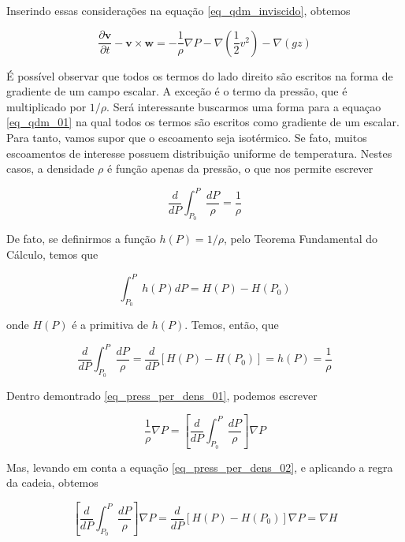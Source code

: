 \documentclass[a4paper,portuguese,10pt]{article}
\newcommand{\grad}{\nabla}
\renewcommand{\D}{\partial}
\renewcommand{\vec}{\mathbf}
\begin{document}
Inserindo essas considerações na equação \ref{eq_qdm_inviscido}, obtemos

\begin{equation}
  \frac{\D\vec{v}}{\D t} -\vec{v}\times\vec{w} = -\frac{1}{\rho}\grad P - \grad\left(\frac{1}{2}v^2\right) -\grad(gz)
\label{eq_qdm_01}
\end{equation}

É possível observar que todos os termos do lado direito são escritos na forma de gradiente de um campo escalar. A exceção é o termo da pressão, que é multiplicado por $1/\rho$. Será interessante buscarmos uma forma para a equaçao \ref{eq_qdm_01} na qual todos os termos são escritos como gradiente de um escalar. Para tanto, vamos supor que o escoamento seja isotérmico. Se fato, muitos escoamentos de interesse possuem distribuição uniforme de temperatura. Nestes casos, a densidade $\rho$ é função apenas da pressão, o que nos permite escrever

\begin{equation}
  \frac{d}{dP}\int_{P_0}^P\frac{dP}{\rho} = \frac{1}{\rho}
  \label{eq_press_per_dens_01}
\end{equation}

De fato, se definirmos a função $h(P) = 1/\rho$, pelo Teorema Fundamental do Cálculo, temos que

\begin{equation}
  \int_{P_0}^Ph(P)dP = H(P) - H(P_0)
  \label{eq_press_per_dens_02}
\end{equation}

onde $H(P)$ é a primitiva de $h(P)$. Temos, então, que

\begin{equation}
  \frac{d}{dP}\int_{P_0}^P\frac{dP}{\rho} = \frac{d}{dP}\left[H(P)-H(P_0)\right] = h(P) = \frac{1}{\rho}
  \label{eq_press_per_dens_03}
\end{equation}

Dentro demontrado \ref{eq_press_per_dens_01}, podemos escrever

\begin{equation}
  \frac{1}{\rho}\grad P = \left[ \frac{d}{dP}\int_{P_0}^P\frac{dP}{\rho} \right] \grad P
  \label{eq_press_per_dens_04}
\end{equation}

Mas, levando em conta a equação \ref{eq_press_per_dens_02}, e aplicando a regra da cadeia, obtemos

\begin{equation}
  \left[ \frac{d}{dP}\int_{P_0}^P\frac{dP}{\rho} \right] \grad P = \frac{d}{dP}[H(P) - H(P_0)]\grad P = \grad H
  \label{eq_press_per_dens_05}
\end{equation}
\end{document}
